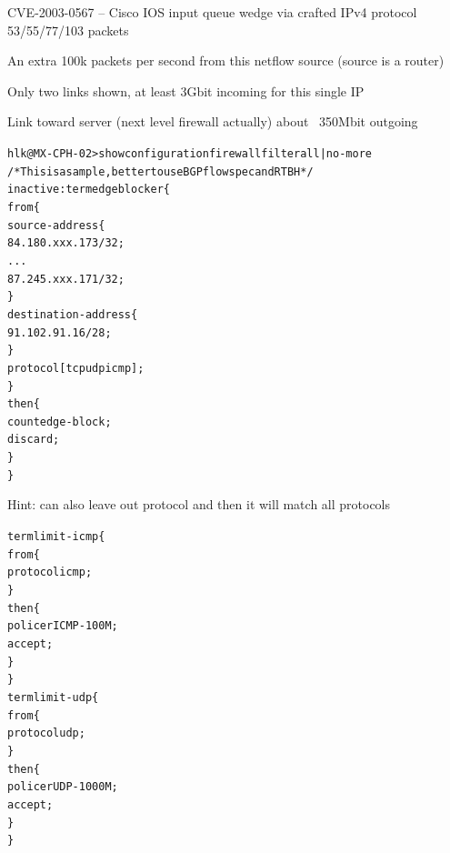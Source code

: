 \documentclass[20pt,landscape,a4paper,footrule]{foils}
\begin{document}
\vskip 0.5cm
CVE-2003-0567 -- Cisco IOS input queue wedge via crafted IPv4 protocol 53/55/77/103 packets\\









\centerline{An extra 100k packets per second from this netflow source (source is a router)}




\centerline{Only two links shown, at least 3Gbit incoming for this single IP}

\centerline{Link toward server (next level firewall actually) about ~350Mbit outgoing}



\begin{alltt}\footnotesize
hlk@MX-CPH-02> show configuration firewall filter all | no-more
/* This is a sample, better to use BGP flowspec and RTBH */
inactive: term edgeblocker \{
    from \{
        source-address \{
            84.180.xxx.173/32;
...
            87.245.xxx.171/32;
        \}
        destination-address \{
            91.102.91.16/28;
        \}
        protocol [ tcp udp icmp ];
    \}
    then \{
        count edge-block;
        discard;
    \}
\}
\end{alltt}
Hint: can also leave out protocol and then it will match all protocols


\begin{alltt}\footnotesize
term limit-icmp \{
    from \{
        protocol icmp;
    \}
    then \{
        policer ICMP-100M;
        accept;
    \}
\}
term limit-udp \{
    from \{
        protocol udp;
    \}
    then \{
        policer UDP-1000M;
        accept;
    \}
\}
\end{alltt}
\end{document}
